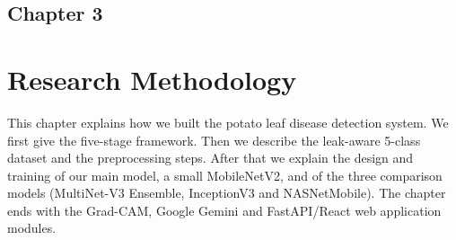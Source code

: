 \begin{center}
    \section*{\fontsize{20}{20}\selectfont Chapter 3}
\end{center}
\vspace{10mm}
\section{Research Methodology}

This chapter explains how we built the potato leaf disease detection system. We first give the five-stage framework. Then we describe the leak-aware 5-class dataset and the preprocessing steps. After that we explain the design and training of our main model, a small MobileNetV2, and of the three comparison models (MultiNet-V3 Ensemble, InceptionV3 and NASNetMobile). The chapter ends with the Grad-CAM, Google Gemini and FastAPI/React web application modules.


